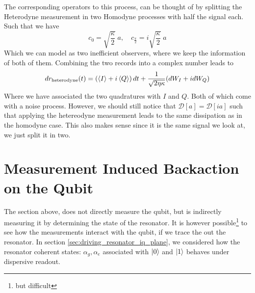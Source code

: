 The corresponding operators to this process, can be thought of by splitting the Heterodyne measurement in two Homodyne processes with half the signal each. Such that we have
\begin{equation}
    c_0 = \sqrt{\frac{\kappa}{2}}\; a, \quad c_{\frac{\pi}{2}} = i \sqrt{\frac{\kappa}{2}} \; a
\end{equation}
Which we can model as two inefficient observers, where we keep the information of both of them. Combining the two records into a complex number leads to
\begin{equation}
    dr_{\text{heterodyne}}(t) = \left(\expval{I} + i\expval{Q}\right)dt  + \frac{1}{\sqrt{2\eta\kappa}}(dW_I + i dW_Q)
\end{equation}
Where we have associated the two quadratures with $I$ and $Q$. Both of which come with a noise process. However, we should still notice that $\mathcal{D}[a] = \mathcal{D}[ia]$ such that applying the hetereodyne measurement leads to the same dissipation as in the homodyne case. This also makes sense since it is the same signal we look at, we just split it in two. 


\section{Measurement Induced Backaction on the Qubit}\label{sec:qubit_backaction}
The section above, does not directly measure the qubit, but is indirectly measuring it by determining the state of the resonator. It is however possible\footnote{but difficult} to see how the measurements interact with the qubit, if we trace the out the resonator. In section \ref{sec:driving_resonator_iq_plane}, we considered how the resonator coherent states: $\alpha_g, \alpha_e$ associated with $\ket{0}$ and $\ket{1}$ behaves under dispersive readout. 

